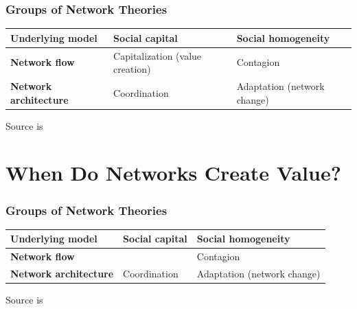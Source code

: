 \documentclass[notes, aspectratio=1610]{beamer}
\begin{document}
\begin{frame}
	\frametitle{Groups of Network Theories}
	\centering
	\small
	\begin{table}
		\begin{center}
			\begin{tabular}[c]{l|l|l}
				\textbf{Underlying model} & 
				\textbf{Social capital} &
				\textbf{Social homogeneity}\\
				\hline
				\textbf{Network flow} & Capitalization (value creation) & Contagion  \\
				\hline
				\textbf{Network architecture} & Coordination & Adaptation  (network change)\\
			\end{tabular}
		\end{center}
	\end{table}

	\vspace{1em}

	\raggedright \small Source is~\cite[][page 47]{scott2011}
\end{frame}

\section{When Do Networks Create Value?}

\begin{frame}
	\frametitle{Groups of Network Theories}
	\centering
	\small
	\begin{table}
		\begin{center}
			\begin{tabular}[c]{l|l|l}
				\textbf{Underlying model} & 
				\textbf{Social capital} &
				\textbf{Social homogeneity}\\
				\hline
				\textbf{Network flow} & \cellcolor{blue!20}{\color{black}{Capitalization (value creation)}} & Contagion  \\
				\hline
				\textbf{Network architecture} & Coordination & Adaptation  (network change)\\
			\end{tabular}
		\end{center}
	\end{table}

	\vspace{1em}

	\raggedright \small Source is~\cite[][page 47]{scott2011}
\end{frame}
\end{document}
